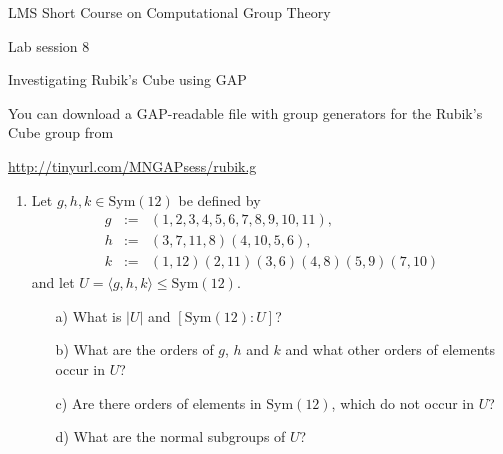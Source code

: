 \documentclass[12pt]{article}
\newcommand{\GAP}{\textsf{GAP}}
\begin{document}
\begin{center}
\large LMS Short Course on Computational Group Theory

\Large Lab session 8

\large Investigating Rubik's Cube using \GAP
\end{center}

You can download a \GAP-readable file with group generators for the Rubik's
Cube group from
\begin{center}
\url{http://tinyurl.com/MNGAPsess/rubik.g}
\end{center}

\begin{enumerate}
\item Let $g, h, k \in \mathrm{Sym}(12)$ be defined by
\begin{eqnarray*}
g &:=& (1,2,3,4,5,6,7,8,9,10,11), \\
h &:=& (3,7,11,8)(4,10,5,6), \\
k &:=& (1,12)(2,11)(3,6)(4,8)(5,9)(7,10) 
\end{eqnarray*}
and let $U = \langle g, h, k \rangle \leq \mathrm{Sym}(12)$.
\begin{itemize}
\item[a)] 
What is $|U|$ and $[\mathrm{Sym}(12):U]$?
\item[b)] 
What are the orders of $g$, $h$ and $k$ and what other orders
of elements occur in $U$?
\item[c)]
Are there orders of elements in $\mathrm{Sym}(12)$, which do not occur in
$U$?
\item[d)]
What are the normal subgroups of $U$?
\end{itemize}


\end{enumerate}
\end{document}
